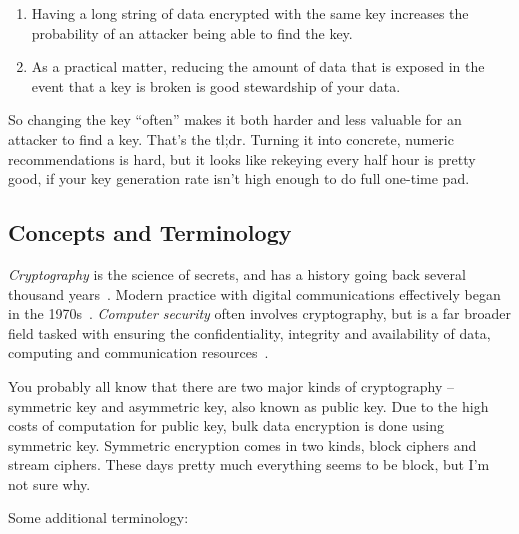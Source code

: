 \documentclass[%
 aip,
 jmp,%
 amsmath,amssymb,
 reprint,%
]{revtex4-1}
\begin{document}
\begin{enumerate}
\item Having a long string of data encrypted with the same key increases
the probability of an attacker being able to find the key.
\item As a practical matter, reducing the amount of data that is exposed
in the event that a key is broken is good stewardship of your data.
\end{enumerate}

So changing the key ``often'' makes it both harder and less valuable
for an attacker to find a key.  That's the tl;dr.  Turning it into
concrete, numeric recommendations is hard, but it looks like rekeying
every half hour is pretty good, if your key generation rate isn't high
enough to do full one-time pad.

\subsection{Concepts and Terminology}

\emph{Cryptography} is the science of secrets, and has a history going
back several thousand years~\cite{kahn1996codebreakers,singh1999code}.
Modern practice with digital communications effectively began in the
1970s~\cite{schneier96:_applied_crypto,menezes1996handbook}.
\emph{Computer security} often involves cryptography, but is a far
broader field tasked with ensuring the confidentiality, integrity and
availability of data, computing and communication
resources~\cite{bishop2002art}.

You probably all know that there are two major kinds of cryptography
-- symmetric key and asymmetric key, also known as public key.  Due to
the high costs of computation for public key, bulk data encryption is
done using symmetric key.  Symmetric encryption comes in two kinds,
block ciphers and stream ciphers.  These days pretty much everything
seems to be block, but I'm not sure why.

Some additional terminology:
\end{document}
